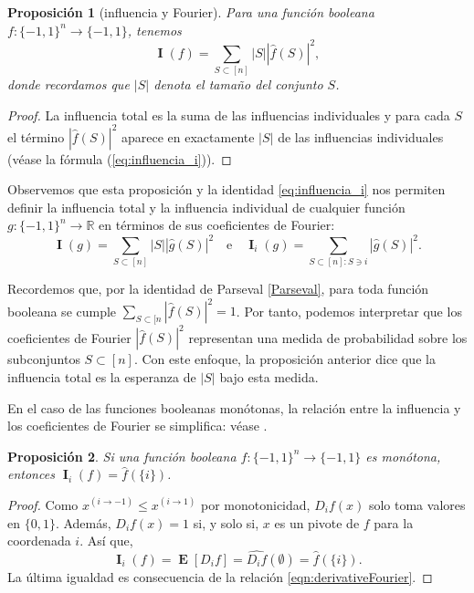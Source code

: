 \documentclass[autocontact]{gaceta}
\newcommand{\R}{\mathbb{R}}
\newtheorem{proposition}{Proposición}
\DeclareMathOperator{\II}{\mathbf{I}}
\DeclareMathOperator{\EE}{\mathbf{E}}
\begin{document}
\begin{proposition}[influencia y Fourier]
\label{prop:influence-Fourier}
Para una función booleana
$f:\{-1,1\}^n\to \{-1,1\}$, tenemos
\[
\II(f)=\sum_{S\subset [n]} |S| |\widehat{f}(S)|^2,
\]
donde recordamos que $|S|$ denota el tamaño del conjunto $S$.
\end{proposition}

\begin{proof}
La influencia total es la suma de las influencias individuales y para cada $S$ el término $|\widehat{f}(S)|^2$ aparece en exactamente $|S|$ de las influencias individuales (véase la fórmula (\ref{eq:influencia_i})).
\end{proof}

Observemos que esta proposición y la identidad \eqref{eq:influencia_i} nos permiten definir la influencia total y la influencia individual de cualquier función $g:\{-1,1\}^n \to \R$ en términos de sus coeficientes de Fourier:
\[
\II(g)=\sum_{S\subset [n]} |S| |\widehat{g}(S)|^2
\quad\text{e} \quad
\II_i(g)= \sum_{S\subset [n]:S\ni i}|\widehat{g}(S)|^2.
\]

Recordemos que, por la identidad de Parseval \eqref{Parseval}, para toda función booleana se cumple $\sum_{S\subset [n}|\widehat{f}(S)|^2=1$. Por tanto, podemos interpretar que los coeficientes de Fourier $|\widehat{f}(S)|^2$ representan una medida de probabilidad sobre los subconjuntos $S\subset [n]$. Con este enfoque, la proposición anterior dice que la influencia total es la esperanza de $|S|$ bajo esta medida.

En el caso de las funciones booleanas monótonas, la relación entre la influencia y los coeficientes de Fourier se simplifica: véase \cite[proposición 2.21]{O'Do21}.

\begin{proposition}\label{prop:influenceMonotone}
Si una función booleana $f:\{-1,1\}^n\to \{-1,1\}$ es monótona, entonces $\II_i(f)=\widehat{f}(\{i\})$.
\end{proposition}

\begin{proof}
Como $x^{(i\to -1)}\leq x^{(i\to1)}$ por monotonicidad, $D_if(x)$ solo toma valores en $\{0,1\}$. Además, $D_if(x)=1$ si, y solo si, $x$ es un pivote de $f$ para la coordenada $i$. Así que,
\[
\II_i(f) = \EE [ D_if]= \widehat{D_if}(\emptyset)=\widehat{f}(\{i\}).
\]
La última igualdad es consecuencia de la relación \eqref{eqn:derivativeFourier}.
\end{proof}
\end{document}
